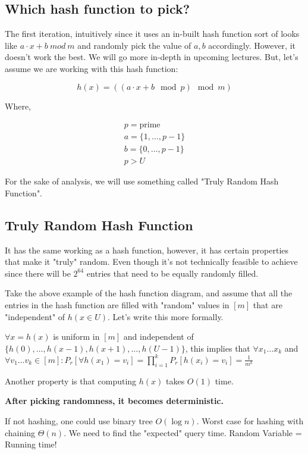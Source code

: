 \documentclass{article}
\begin{document}
\subsection{Which hash function to pick?}

The first iteration, intuitively since it uses an in-built hash function sort of looks like $a\cdot x + b \: mod \: m$ and randomly pick the value of $a, b$ accordingly. However, it doesn't work the best. We will go more in-depth in upcoming lectures. But, let's assume we are working with this hash function:

$$
h(x) = ((a \cdot x + b \mod p) \mod m)
$$

Where,

\begin{align*}
    p = \text{prime} \\
    a = \{1, \ldots, p-1\} \\
    b = \{0, \ldots, p-1\} \\
    p > U
\end{align*}

For the sake of analysis, we will use something called "Truly Random Hash Function".

\subsection{Truly Random Hash Function}

It has the same working as a hash function, however, it has certain properties that make it "truly" random. Even though it's not technically feasible to achieve since there will be $2^{64}$ entries that need to be equally randomly filled.

Take the above example of the hash function diagram, and assume that all the entries in the hash function are filled with "random" values in $[m]$ that are "independent" of $h(x \in U)$. Let's write this more formally.

$\forall x = h(x)$ is uniform in $[m]$ and independent of $\{h(0), \ldots, h(x-1), h(x+1), \ldots, h(U-1)\}$, this implies that $\forall x_1 \ldots x_k$ and $\forall v_1 \ldots v_k \in [m]: P_r[\forall h(x_1) = v_i] = \prod^{k}_{i=1} P_r[h(x_i) = v_i] = \frac{1}{m^k}$

Another property is that computing $h(x)$ takes $O(1)$ time.

\textbf{After picking randomness, it becomes deterministic.}

If not hashing, one could use binary tree $O(\log n)$. Worst case for hashing with chaining $\Theta(n)$. We need to find the "expected" query time. Random Variable = Running time!
\end{document}
